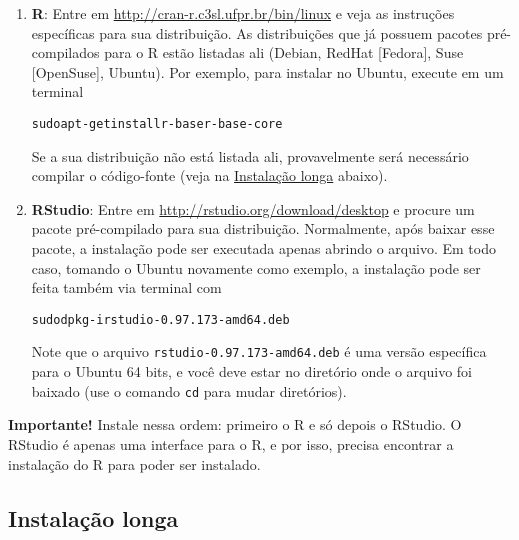 \documentclass[a4paper,12pt]{article}\usepackage{graphicx, color}
\makeatletter
\newenvironment{kframe}{%
 \def\at@end@of@kframe{}%
 \ifinner\ifhmode%
  \def\at@end@of@kframe{\end{minipage}}%
  \begin{minipage}{\columnwidth}%
 \fi\fi%
 \def\FrameCommand##1{\hskip\@totalleftmargin \hskip-\fboxsep
 \colorbox{shadecolor}{##1}\hskip-\fboxsep
     \hskip-\linewidth \hskip-\@totalleftmargin \hskip\columnwidth}%
 \MakeFramed {\advance\hsize-\width
   \@totalleftmargin\z@ \linewidth\hsize
   \@setminipage}}%
 {\par\unskip\endMakeFramed%
 \at@end@of@kframe}
\newenvironment{knitrout}{}{} %
\providecommand{\R}{\textsf{R}\xspace}
\providecommand{\RStudio}{\textsf{RStudio}\xspace}
\makeatother
\begin{document}
\begin{enumerate}
\item \textbf{\R}: Entre em \url{http://cran-r.c3sl.ufpr.br/bin/linux} e
  veja as instruções específicas para sua distribuição. As distribuições
  que já possuem pacotes pré-compilados para o \R estão listadas ali
  (Debian, RedHat [Fedora], Suse [OpenSuse], Ubuntu). Por exemplo, para
  instalar no Ubuntu, execute em um terminal
\begin{knitrout}\small
{}\color{fgcolor}\begin{kframe}
\begin{alltt}
 sudo apt-get install r-base r-base-core
\end{alltt}
\end{kframe}
\end{knitrout}

  Se a sua distribuição não está listada ali, provavelmente será
  necessário compilar o código-fonte (veja na
  \hyperref[sec:ill]{Instalação longa} abaixo).
\item \textbf{\RStudio}: Entre em
  \url{http://rstudio.org/download/desktop} e procure um pacote
  pré-compilado para sua distribuição. Normalmente, após baixar esse
  pacote, a instalação pode ser executada apenas abrindo o arquivo. Em
  todo caso, tomando o Ubuntu novamente como exemplo, a instalação pode
  ser feita também via terminal com
\begin{knitrout}\small
{}\color{fgcolor}\begin{kframe}
\begin{alltt}
 sudo dpkg -i rstudio-0.97.173-amd64.deb
\end{alltt}
\end{kframe}
\end{knitrout}

  Note que o arquivo \texttt{rstudio-0.97.173-amd64.deb} é uma versão
  específica para o Ubuntu 64 bits, e você deve estar no diretório onde
  o arquivo foi baixado (use o comando \texttt{cd} para mudar
  diretórios).

\end{enumerate}

\textbf{Importante!} Instale nessa ordem: primeiro o \R e só depois o
\RStudio. O \RStudio é apenas uma interface para o \R, e por isso,
precisa encontrar a instalação do \R para poder ser instalado.

\subsection{Instalação longa}
\label{sec:ill}
\end{document}
